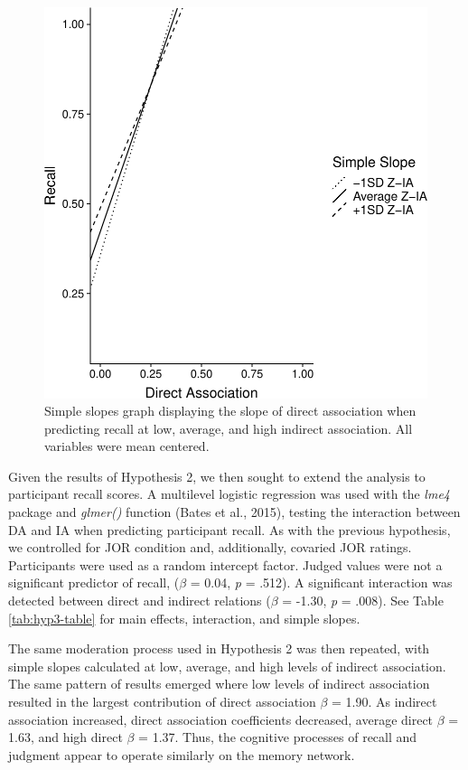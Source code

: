 \documentclass[english,,man]{apa6}
\begin{document}
\begin{figure}
\centering
\includegraphics{max_buch_JOL_files/figure-latex/hyp3graph-1.pdf}
\caption{\label{fig:hyp3graph}Simple slopes graph displaying the slope of direct association when predicting recall at low, average, and high indirect association. All variables were mean centered.}
\end{figure}

Given the results of Hypothesis 2, we then sought to extend the analysis to participant recall scores. A multilevel logistic regression was used with the \emph{lme4} package and \emph{glmer()} function (Bates et al., 2015), testing the interaction between DA and IA when predicting participant recall. As with the previous hypothesis, we controlled for JOR condition and, additionally, covaried JOR ratings. Participants were used as a random intercept factor. Judged values were not a significant predictor of recall, (\(\beta\) = 0.04, \emph{p} = .512). A significant interaction was detected between direct and indirect relations (\(\beta\) = -1.30, \emph{p} = .008). See Table \ref{tab:hyp3-table} for main effects, interaction, and simple slopes.

The same moderation process used in Hypothesis 2 was then repeated, with simple slopes calculated at low, average, and high levels of indirect association. The same pattern of results emerged where low levels of indirect association resulted in the largest contribution of direct association \(\beta\) = 1.90. As indirect association increased, direct association coefficients decreased, average direct \(\beta\) = 1.63, and high direct \(\beta\) = 1.37. Thus, the cognitive processes of recall and judgment appear to operate similarly on the memory network.
\end{document}
